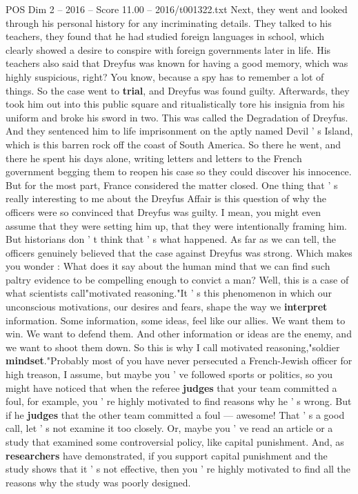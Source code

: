 \begin{textsample}{POS Dim 2 – 2016 – Score 11.00 – 2016/t001322.txt}
Next, they went and looked through his personal history for any incriminating details.
They talked to his teachers, they found that he had studied foreign languages in school, which clearly showed a desire to conspire with foreign governments later in life.
His teachers also said that Dreyfus was known for having a good memory, which was highly suspicious, right?
You know, because a spy has to remember a lot of things.
So the case went to \textbf{trial}, and Dreyfus was found guilty.
Afterwards, they took him out into this public square and ritualistically tore his insignia from his uniform and broke his sword in two.
This was called the Degradation of Dreyfus.
And they sentenced him to life imprisonment on the aptly named Devil ' s Island, which is this barren rock off the coast of South America.
So there he went, and there he spent his days alone, writing letters and letters to the French government begging them to reopen his case so they could discover his innocence.
But for the most part, France considered the matter closed.
One thing that ' s really interesting to me about the Dreyfus Affair is this question of why the officers were so convinced that Dreyfus was guilty.
I mean, you might even assume that they were setting him up, that they were intentionally framing him.
But historians don ' t think that ' s what happened.
As far as we can tell, the officers genuinely believed that the case against Dreyfus was strong.
Which makes you wonder : What does it say about the human mind that we can find such paltry evidence to be compelling enough to convict a man?
Well, this is a case of what scientists call"motivated reasoning."It ' s this phenomenon in which our unconscious motivations, our desires and fears, shape the way we \textbf{interpret} information.
Some information, some ideas, feel like our allies.
We want them to win.
We want to defend them.
And other information or ideas are the enemy, and we want to shoot them down.
So this is why I call motivated reasoning,"soldier \textbf{mindset}."Probably most of you have never persecuted a French-Jewish officer for high treason, I assume, but maybe you ' ve followed sports or politics, so you might have noticed that when the referee \textbf{judges} that your team committed a foul, for example, you ' re highly motivated to find reasons why he ' s wrong.
But if he \textbf{judges} that the other team committed a foul — awesome!
That ' s a good call, let ' s not examine it too closely.
Or, maybe you ' ve read an article or a study that examined some controversial policy, like capital punishment.
And, as \textbf{researchers} have demonstrated, if you support capital punishment and the study shows that it ' s not effective, then you ' re highly motivated to find all the reasons why the study was poorly designed.

\end{textsample}

